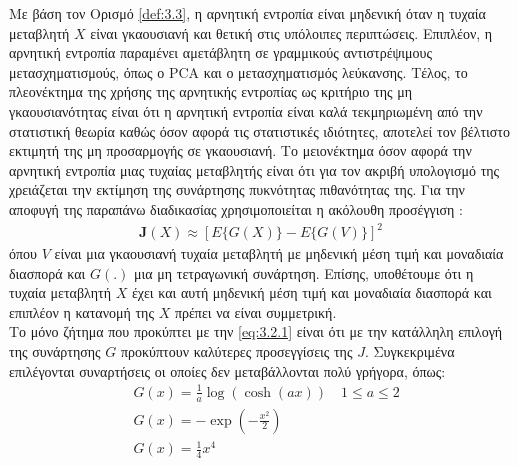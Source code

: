 \gr Με βάση τον Ορισμό \ref{def:3.3}, η αρνητική εντροπία είναι μηδενική όταν η τυχαία μεταβλητή \en $X$ \gr είναι γκαουσιανή και θετική στις υπόλοιπες περιπτώσεις. Επιπλέον, η αρνητική εντροπία παραμένει αμετάβλητη σε γραμμικούς αντιστρέψιμους μετασχηματισμούς, όπως ο \en PCA \gr και ο μετασχηματισμός λεύκανσης. Τέλος, το πλεονέκτημα της χρήσης της αρνητικής εντροπίας ως κριτήριο της μη γκαουσιανότητας είναι ότι η αρνητική εντροπία είναι καλά τεκμηριωμένη από την στατιστική θεωρία καθώς όσον αφορά τις στατιστικές ιδιότητες, αποτελεί τον βέλτιστο εκτιμητή της μη προσαρμογής σε γκαουσιανή.
\newpage
\noindent Το μειονέκτημα όσον αφορά την αρνητική εντροπία μιας τυχαίας μεταβλητής είναι ότι για τον ακριβή υπολογισμό της χρειάζεται την εκτίμηση της συνάρτησης πυκνότητας πιθανότητας της. Για την αποφυγή της παραπάνω διαδικασίας χρησιμοποιείται η ακόλουθη προσέγγιση \cite{ica:6}: \en
\begin{align} \label{eq:3.2.1}
    \mathbf{J}(X) \approx \left [ E\{ G(X)\} - E\{G(V)\} \right ]^2
\end{align}
\gr όπου \en $V$ \gr είναι μια γκαουσιανή τυχαία μεταβλητή με μηδενική μέση τιμή και μοναδιαία διασπορά και \en $G(.)$ \gr μια μη τετραγωνική συνάρτηση. Επίσης, υποθέτουμε ότι η τυχαία μεταβλητή \en $X$ \gr έχει και αυτή μηδενική μέση τιμή και μοναδιαία διασπορά και επιπλέον η κατανομή της \en $X$ \gr  πρέπει να είναι συμμετρική.
\\ [0.5 \baselineskip]
Το μόνο ζήτημα που προκύπτει με την \eqref{eq:3.2.1} είναι ότι με την κατάλληλη επιλογή της συνάρτησης \en $G$ \gr προκύπτουν καλύτερες προσεγγίσεις της \en $J$. \gr Συγκεκριμένα επιλέγονται συναρτήσεις οι οποίες δεν μεταβάλλονται πολύ γρήγορα, όπως: \en
\begin{subequations}
\begin{align}
&G(x) = \frac{1}{a} \log (\cosh (ax)) \quad 1 \leq a \leq 2 \label{eq:3.2.2a} \\
&G(x) = - \exp (- \frac{x^2}{2}) \label{eq:3.2.2b} \\
&G(x) = \frac{1}{4} x^4 \label{eq:3.2.2c}
\end{align}
\end{subequations} \gr
